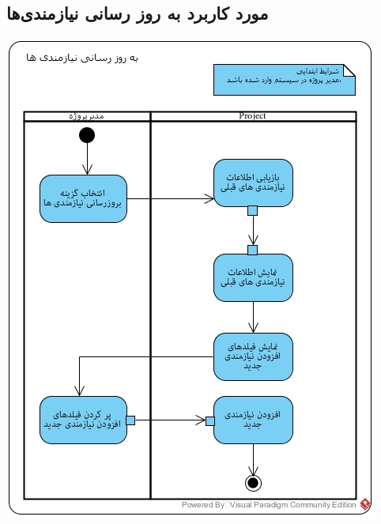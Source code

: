 \subsection*{مورد کاربرد به روز رسانی نیازمندی‌ها}
\vspace{2cm}
\begin{center}
\includegraphics[width=\textwidth]{ActivityDiagramsWithSwimlanes/24.jpg}
\end{center}

\newpage
\vspace{2cm}
